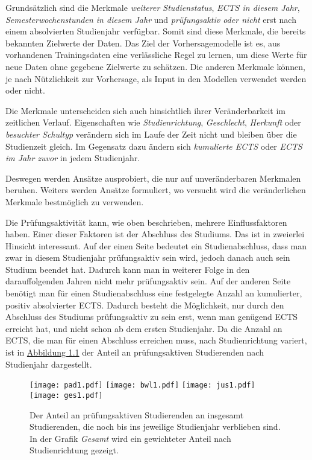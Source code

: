 Grunds\"atzlich sind die Merkmale \textit{\glqq weiterer Studienstatus\grqq{}},
\textit{\glqq ECTS in diesem Jahr\grqq{}}, \textit{\glqq Semesterwochenstunden in diesem Jahr\grqq{}} und
\textit{\glqq pr\"ufungsaktiv oder nicht\grqq{}} erst nach einem absolvierten Studienjahr verf\"ugbar. Somit sind diese Merkmale,
die bereits bekannten Zielwerte der Daten. Das Ziel der Vorhersagemodelle ist es, aus vorhandenen Trainingsdaten eine verl\"assliche
Regel zu lernen, um diese Werte f\"ur neue Daten ohne gegebene Zielwerte zu
sch\"atzen. Die anderen Merkmale k\"onnen, je nach N\"utzlichkeit zur Vorhersage, als Input
in den Modellen verwendet werden oder nicht.

Die Merkmale unterscheiden sich auch hinsichtlich ihrer Ver\"anderbarkeit im zeitlichen Verlauf. Eigenschaften wie \textit{\glqq Studienrichtung\grqq{}},
\textit{\glqq Geschlecht\grqq{}}, \textit{\glqq Herkunft\grqq{}} oder \textit{\glqq besuchter Schultyp\grqq{}} ver\"andern sich im Laufe der Zeit nicht und bleiben \"uber die Studienzeit gleich.
Im Gegensatz dazu \"andern sich \textit{\glqq kumulierte ECTS\grqq{}} oder \textit{\glqq ECTS im Jahr zuvor\grqq{}} in jedem Studienjahr.

Deswegen werden Ans\"atze ausprobiert, die nur auf unver\"anderbaren Merkmalen beruhen. Weiters werden Ans\"atze formuliert, wo versucht wird
die ver\"anderlichen Merkmale bestm\"oglich zu verwenden.

Die Pr\"ufungsaktivit\"at kann, wie oben beschrieben, mehrere Einflussfaktoren haben. Einer dieser Faktoren ist der Abschluss des Studiums. Das ist in zweierlei Hinsicht interessant.
Auf der einen Seite bedeutet ein Studienabschluss, dass man zwar in diesem Studienjahr pr\"ufungsaktiv sein wird, jedoch danach auch sein Studium beendet hat.
Dadurch kann man in weiterer Folge in den darauffolgenden Jahren nicht mehr pr\"ufungsaktiv sein.
Auf der anderen Seite ben\"otigt man f\"ur einen Studienabschluss eine festgelegte Anzahl an kumulierter, positiv absolvierter ECTS. Dadurch besteht die
M\"oglichkeit, nur durch den Abschluss des Studiums pr\"ufungsaktiv zu sein erst, wenn man gen\"ugend ECTS erreicht hat, und nicht schon ab dem ersten Studienjahr.
Da die Anzahl an ECTS, die man f\"ur einen Abschluss erreichen muss, nach Studienrichtung variert, ist in \hyperref[fig:abb1]{Abbildung 1.1}
der Anteil an pr\"ufungsaktiven Studierenden nach Studienjahr dargestellt.

\begin{figure}[ht]
  \label{fig:abb1}
  \texttt{[image: pad1.pdf]}
  \texttt{[image: bwl1.pdf]}
  \texttt{[image: jus1.pdf]}
  \texttt{[image: ges1.pdf]}
  \caption[Anteil an pr\"ufungsaktiven Studierenden nach Studienjahr und -richtung]{Der Anteil an pr\"ufungsaktiven Studierenden an insgesamt Studierenden, die noch bis ins jeweilige
    Studienjahr verblieben sind. In der Grafik \textit{Gesamt} wird ein gewichteter
    Anteil nach Studienrichtung gezeigt.}
\end{figure}

